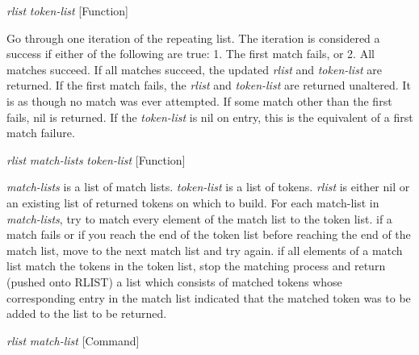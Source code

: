 \vspace{1em}
\noindent
{}
\usebox{\funcname}\emph{rlist} \emph{token-list}
 \hfill [Function]
\hspace*{\wd\funcname}

\begin{doc-string}
Go through one iteration of the repeating list.  The iteration is considered
a success if either of the following are true: 1. The first match fails, or
2. All matches succeed.  If all matches succeed, the updated \emph{rlist} and
\emph{token-list} are returned.  If the first match fails, the \emph{rlist} and \emph{token-list} are
returned unaltered.  It is as though no match was ever attempted.  If some match
other than the first fails, nil is returned.  If the \emph{token-list} is nil on entry,
this is the equivalent of a first match failure.
\end{doc-string}

\vspace{1em}
\noindent
{}
\usebox{\funcname}\emph{rlist} \emph{match-lists} \emph{token-list}
 \hfill [Function]

\begin{doc-string}
\emph{match-lists} is a list of match lists.  \emph{token-list} is a list of tokens.  \emph{rlist}
is either nil or an existing list of returned tokens on which to build.  For
each match-list in \emph{match-lists}, try to match every element of the match list to
the token list.  if a match fails or if you reach the end of the token list
before reaching the end of the match list, move to the next match list and try
again.  if all elements of a match list match the tokens in the token list, stop
the matching process and return (pushed onto RLIST) a list which consists of
matched tokens whose corresponding entry in the match list indicated that the
matched token was to be added to the list to be returned.
\end{doc-string}

\vspace{1em}
\noindent
{}
\usebox{\funcname}\emph{rlist} \emph{match-list}
 \hfill [Command]
\hspace*{\wd\funcname}

